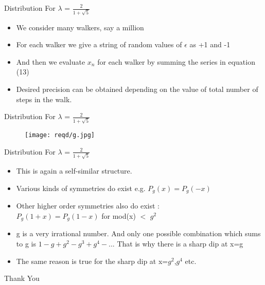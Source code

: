 \documentclass{beamer}
\begin{document}
\begin{frame}{Distribution For $\lambda$ = $\frac{2}{1+\sqrt{5}}$}
	\begin{itemize}
	\setlength\itemsep{1em}
		\item{\large We consider many walkers, say a million}
		\item{\large For each walker we give a string of random values of $\epsilon$ as +1 and -1}
		\item{\large And then we evaluate $x_n$ for each walker by summing the series in equation (13)}
		\item{\large Desired precision can be obtained depending on the value of total number of steps in the walk.}
	\end{itemize}
\end{frame}

\begin{frame}{Distribution For $\lambda$ = $\frac{2}{1+\sqrt{5}}$}
	\begin{figure}
    		\centering
    		\texttt{[image: reqd/g.jpg]}
	\end{figure}
\end{frame}

\begin{frame}{Distribution For $\lambda$ = $\frac{2}{1+\sqrt{5}}$}
	\begin{itemize}
	\setlength\itemsep{1em}
		\item{\large This is again a self-similar structure.}
		\item{\large Various kinds of symmetries do exist e.g. $P_{g}(x)=P_{g}(-x)$}
		\item{\large Other higher order symmetries also do exist :\\
		\vspace{1em}	
		$P_{g}(1+x)=P_{g}(1-x)$ for mod(x) $<$ $g^{2}$}
		\item{\large g is a very irrational number. And only one possible combination which sums to g is $1-g+g^2-g^3+g^4-$... That is why there is a sharp dip at x=g}
		\item{\large The same reason is true for the sharp dip at x=$g^2$,$g^4$ etc.}
	\end{itemize}
\end{frame}

\begin{frame}
	\centering
	\Huge Thank You
\end{frame}
\end{document}
